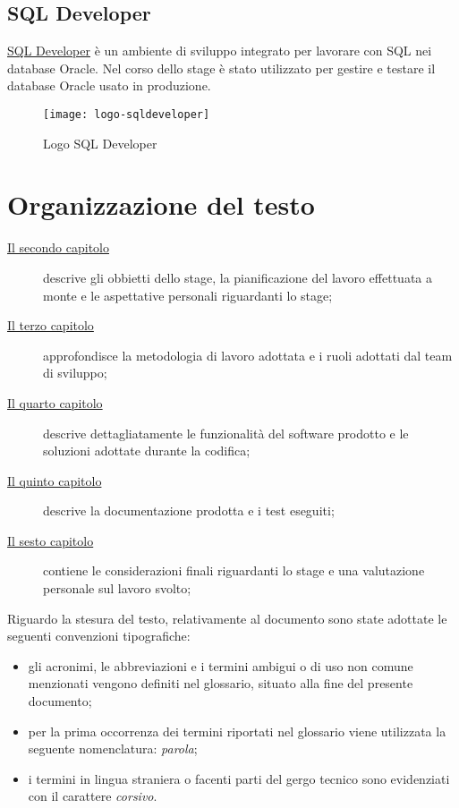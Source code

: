 \subsection{SQL Developer}
\href{https://www.oracle.com/database/technologies/appdev/sqldeveloper-landing.html}{SQL Developer} è un ambiente di sviluppo integrato per lavorare con SQL nei database Oracle. Nel corso dello stage è stato utilizzato per gestire e testare il database Oracle usato in produzione.
\begin{figure}[h]
    \begin{center}
    \texttt{[image: logo-sqldeveloper]}
    \caption{Logo SQL Developer}
    \label{fig:figure13}
    \end{center}
\end{figure}

\section{Organizzazione del testo}

\begin{description}
    \item[{\hyperref[cap:obbiettivi-pianificazione]{Il secondo capitolo}}] descrive gli obbietti dello stage, la pianificazione del lavoro effettuata a monte e le aspettative personali riguardanti lo stage;
    
    \item[{\hyperref[cap:metodologia-lavoro]{Il terzo capitolo}}] approfondisce la metodologia di lavoro adottata e i ruoli adottati dal team di sviluppo;
    
    \item[{\hyperref[cap:prodotto-sw]{Il quarto capitolo}}] descrive dettagliatamente le funzionalità del software prodotto e le soluzioni adottate durante la codifica;
    
    \item[{\hyperref[cap:docs-test]{Il quinto capitolo}}] descrive la documentazione prodotta e i test eseguiti;
    
    \item[{\hyperref[cap:considerazioni]{Il sesto capitolo}}] contiene le considerazioni finali riguardanti lo stage e una valutazione personale sul lavoro svolto;

\end{description}

Riguardo la stesura del testo, relativamente al documento sono state adottate le seguenti convenzioni tipografiche:
\begin{itemize}
	\item gli acronimi, le abbreviazioni e i termini ambigui o di uso non comune menzionati vengono definiti nel glossario, situato alla fine del presente documento;
	\item per la prima occorrenza dei termini riportati nel glossario viene utilizzata la seguente nomenclatura: \emph{parola}\glsfirstoccur;
	\item i termini in lingua straniera o facenti parti del gergo tecnico sono evidenziati con il carattere \emph{corsivo}.
\end{itemize}